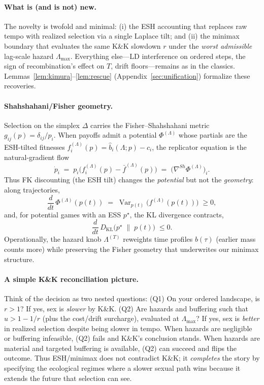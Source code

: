 \documentclass[11pt]{article}
\theoremstyle{upright}
\newcommand{\horizon}{\Lambda}
\newcommand{\Lmax}{\horizon^{(T)}_{\max}}
\renewcommand{\Lmax}{\Lambda_{\max}}
\begin{document}
\paragraph{What is (and is not) new.}
The novelty is twofold and minimal: (i) the ESH accounting that replaces raw tempo with realized selection via a single Laplace tilt; and (ii) the minimax boundary that evaluates the same K\&K slowdown $r$ under the \emph{worst admissible} lag-scale hazard $\Lmax$. Everything else—LD interference on ordered steps, the sign of recombination’s effect on $T$, drift floors—remains as in the classics. Lemmas~\ref{lem:kimura}–\ref{lem:rescue} (Appendix~\ref{sec:unification}) formalize these recoveries.

\paragraph{Shahshahani/Fisher geometry.}
Selection on the simplex \(\Delta\) carries the Fisher--Shahshahani metric \(g_{ij}(p)=\delta_{ij}/p_i\).
When payoffs admit a potential \(\Phi^{(\Lambda)}\) whose partials are the ESH-tilted fitnesses
\(f_i^{(\Lambda)}(p)=\widehat b_i(\Lambda;p)-c_i\), the replicator equation is the natural-gradient flow
\[
\dot p_i \;=\; p_i\big(f_i^{(\Lambda)}(p)-\bar f^{(\Lambda)}(p)\big)
\;=\; \big(\nabla^{\!Sh}\Phi^{(\Lambda)}\big)_i.
\]
Thus FK discounting (the ESH tilt) changes the \emph{potential} but not the \emph{geometry}:
along trajectories,
\[
\frac{d}{dt}\,\Phi^{(\Lambda)}(p(t)) \;=\; \operatorname{Var}_{p(t)}\!\big(f^{(\Lambda)}(p(t))\big)\;\ge 0,
\]
and, for potential games with an ESS \(p^\star\), the KL divergence contracts,
\[
\frac{d}{dt}\,D_{\mathrm{KL}}\!\big(p^\star\;\|\;p(t)\big)\;\le 0.
\]
Operationally, the hazard knob \(\Lambda^{(T)}\) reweights time profiles \(b(\tau)\) (earlier mass counts more)
while preserving the Fisher geometry that underwrites our minimax structure.

\paragraph{A simple K\&K reconciliation picture.}
Think of the decision as two nested questions: (Q1) On your ordered landscape, is $r>1$? If yes, sex is \emph{slower} by K\&K. (Q2) Are hazards and buffering such that $u>1-1/r$ (plus the cost/drift surcharge), evaluated at $\Lmax$? If yes, sex is \emph{better} in realized selection despite being slower in tempo. When hazards are negligible or buffering infeasible, (Q2) fails and K\&K’s conclusion stands. When hazards are material and targeted buffering is available, (Q2) can succeed and flips the outcome. Thus ESH/minimax does not contradict K\&K; it \emph{completes} the story by specifying the ecological regimes where a slower sexual path wins because it extends the future that selection can see.
\end{document}
